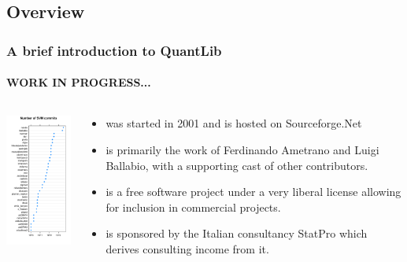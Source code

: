 \documentclass[compress]{beamer}
\begin{document}
\subsection{Overview}
\begin{frame}
  \frametitle{A brief introduction to QuantLib}
  \framesubtitle{WORK IN PROGRESS...}
  \begin{columns}
    \begin{column}{1.5in}
      \includegraphics[width=1.5in]{figures/ql-svn.pdf}
    \end{column}
    
    \begin{column}{3in}
      \begin{itemize}
      \item \QL was started in 2001 and is hosted on Sourceforge.Net
      \item \QL is primarily the work of Ferdinando
        Ametrano and Luigi Ballabio, with a supporting cast of other
        contributors. 
      \item \QL is a free software project under a very liberal license allowing
        for inclusion in commercial projects.
      \item \QL is sponsored by the Italian consultancy StatPro which derives
        consulting income from it. 
      \end{itemize}
    \end{column}
  \end{columns}
\end{frame}
\end{document}
